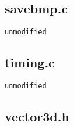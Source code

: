 \documentclass[]{article}
\begin{document}
\subsection*{savebmp.c}
\begin{Verbatim}[fontsize= \footnotesize, tabsize=4]
unmodified
\end{Verbatim}

\subsection*{timing.c}
\begin{Verbatim}[fontsize= \footnotesize, tabsize=4]
unmodified
\end{Verbatim}

\subsection*{vector3d.h} 
\end{document}
